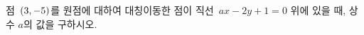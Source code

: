 점~$(3{,}\mkern3mu\mathopen{}-5)$를 원점에 대하여 대칭이동한 점이 \mbox{직선~$ax-2y+1=0$} 위에 있을 때, 상수 $a$의 값을 \mbox{구하시오.}
